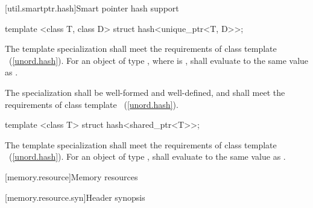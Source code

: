 [util.smartptr.hash]{Smart pointer hash support}

%
\begin{itemdecl}
template <class T, class D> struct hash<unique_ptr<T, D>>;
\end{itemdecl}

\begin{itemdescr}
\pnum The template specialization shall meet the requirements of class
template ~(\ref{unord.hash}). For an object  of type ,
where  is ,  shall evaluate to
the same value as .

\pnum
\requires The specialization  shall be
well-formed and well-defined, and shall meet the requirements of class
template ~(\ref{unord.hash}).
\end{itemdescr}

%
\begin{itemdecl}
template <class T> struct hash<shared_ptr<T>>;
\end{itemdecl}

\begin{itemdescr}
\pnum
The template specialization shall meet the requirements of class
template ~(\ref{unord.hash}). For an object  of type ,
 shall evaluate to
the same value as .
\end{itemdescr}%

[memory.resource]{Memory resources}

[memory.resource.syn]{Header  synopsis}

